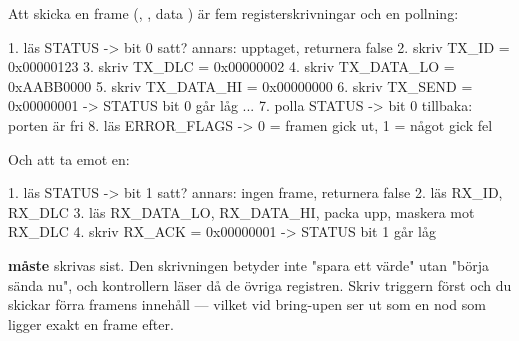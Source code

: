 Att skicka en frame (, , data ) är fem registerskrivningar
och en pollning:

\begin{console}
1. läs   STATUS        -> bit 0 satt? annars: upptaget, returnera false
2. skriv TX_ID         = 0x00000123
3. skriv TX_DLC        = 0x00000002
4. skriv TX_DATA_LO    = 0xAABB0000
5. skriv TX_DATA_HI    = 0x00000000
6. skriv TX_SEND       = 0x00000001      -> STATUS bit 0 går låg
   ...
7. polla STATUS        -> bit 0 tillbaka: porten är fri
8. läs   ERROR_FLAGS   -> 0 = framen gick ut, 1 = något gick fel
\end{console}

Och att ta emot en:

\begin{console}
1. läs   STATUS        -> bit 1 satt? annars: ingen frame, returnera false
2. läs   RX_ID, RX_DLC
3. läs   RX_DATA_LO, RX_DATA_HI, packa upp, maskera mot RX_DLC
4. skriv RX_ACK        = 0x00000001      -> STATUS bit 1 går låg
\end{console}

 \textbf{måste} skrivas sist. Den skrivningen betyder inte "spara ett värde" utan
"börja sända nu", och kontrollern läser då de övriga registren. Skriv triggern först och du
skickar förra framens innehåll --- vilket vid bring-upen ser ut som en nod som ligger exakt en
frame efter.
